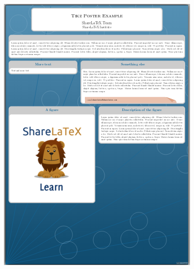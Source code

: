\documentclass[25pt, a0paper, portrait]{tikzposter}
\begin{document}
\begin{columns}
{\begin{tikzfigure}
	    \includegraphics[width=\linewidth]{Tikzposter_theme/Rays}
	\end{tikzfigure}
    }
    {
	\begin{tikzfigure}

\end{tikzfigure}}
\end{columns}
\end{document}
